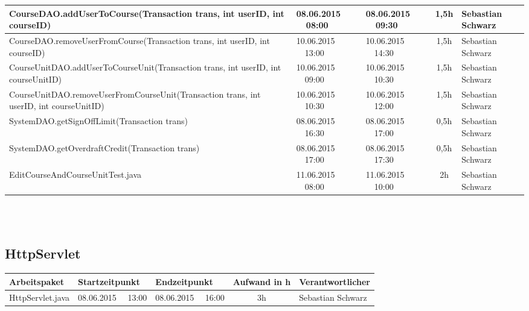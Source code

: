 \begin{landscape}
\begin{tabular}{|p{10.3cm}|p{3.2cm}|p{3.2cm}|c|p{3.5cm}|}
		\hline   CourseDAO.addUserToCourse(Transaction trans, int userID, int courseID)            & 08.06.2015 \ \ 08:00       & 08.06.2015 \ \ 09:30        & 1,5h                 & Sebastian Schwarz\\
		\hline   CourseDAO.removeUserFromCourse(Transaction trans, int userID, int courseID)       & 10.06.2015 \ \ 13:00       & 10.06.2015 \ \ 14:30        & 1,5h                 & Sebastian Schwarz\\
		\hline   CourseUnitDAO.addUserToCourseUnit(Transaction trans, int userID, int courseUnitID)& 10.06.2015 \ \ 09:00       & 10.06.2015 \ \ 10:30        & 1,5h                 & Sebastian Schwarz\\
		\hline   CourseUnitDAO.removeUserFromCourseUnit(Transaction trans, int userID, int courseUnitID) & 10.06.2015 \ \ 10:30       & 10.06.2015 \ \ 12:00        & 1,5h                 & Sebastian Schwarz\\
		\hline   SystemDAO.getSignOffLimit(Transaction trans)                 & 08.06.2015 \ \ 16:30       & 08.06.2015 \ \ 17:00        & 0,5h                 & Sebastian Schwarz\\
		\hline   SystemDAO.getOverdraftCredit(Transaction trans)              & 08.06.2015 \ \ 17:00       & 08.06.2015 \ \ 17:30        & 0,5h                 & Sebastian Schwarz\\
		\hline EditCourseAndCourseUnitTest.java &  11.06.2015 \ \ 08:00       & 11.06.2015 \ \ 10:00       & 2h                 & Sebastian Schwarz\\
		\hline 
	\end{tabular} \ \\
	\ \\
	
	\subsection{HttpServlet}
	\begin{tabular}{|p{10.3cm}|p{3.2cm}|p{3.2cm}|c|p{3.5cm}|}
		\hline  \textbf{Arbeitspaket} & \textbf{Startzeitpunkt} & \textbf{Endzeitpunkt} & \textbf{Aufwand in h} & \textbf{Verantwortlicher} \\ 
		\hline   HttpServlet.java         & 08.06.2015 \ \ 13:00       & 08.06.2015 \ \ 16:00        & 3h                 & Sebastian Schwarz\\
		\hline 
	\end{tabular} \ \\
	\ \\
	

\end{landscape}
